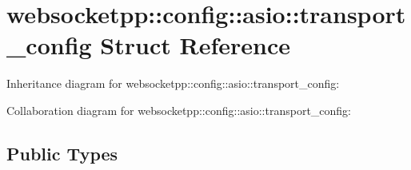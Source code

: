 \hypertarget{structwebsocketpp_1_1config_1_1asio_1_1transport__config}{}\section{websocketpp\+:\+:config\+:\+:asio\+:\+:transport\+\_\+config Struct Reference}
\label{structwebsocketpp_1_1config_1_1asio_1_1transport__config}


Inheritance diagram for websocketpp\+:\+:config\+:\+:asio\+:\+:transport\+\_\+config\+:


Collaboration diagram for websocketpp\+:\+:config\+:\+:asio\+:\+:transport\+\_\+config\+:
\subsection*{Public Types}
